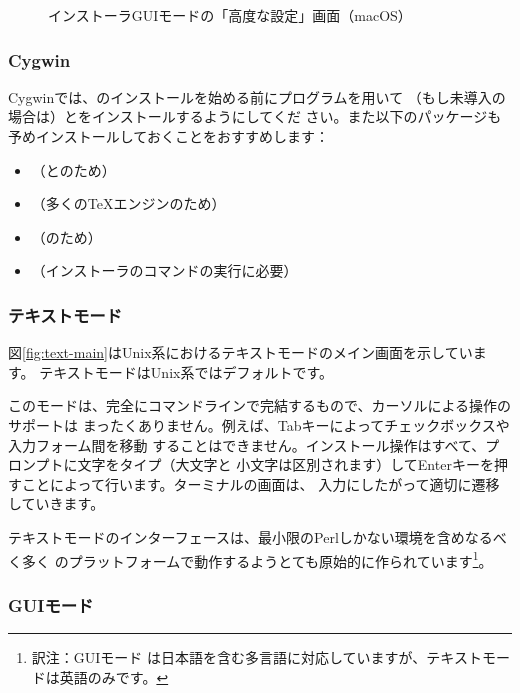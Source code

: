 \documentclass[uplatex,dvipdfmx,12pt]{jsarticle}
\begin{document}
\begin{figure}[tb]
\caption{\TL インストーラGUIモードの「高度な設定」画面（macOS）}
\label{fig:installer-advanced}
\end{figure}

\subsubsection{Cygwin}
\label{sec:cygwin}

Cygwinでは、\TL のインストールを始める前にプログラムを用いて
（もし未導入の場合は）とをインストールするようにしてくだ
さい。また以下のパッケージも予めインストールしておくことをおすすめします：
%
\begin{itemize}
\item {}（\XeTeX と\LuaTeX のため）
\item {}（多くの\TeX エンジンのため）
\item {}（のため）
\item {}（インストーラのコマンドの実行に必要）
\end{itemize}

\subsubsection{テキストモード}

図\ref{fig:text-main}はUnix系におけるテキストモードのメイン画面を示しています。
テキストモードはUnix系ではデフォルトです。

このモードは、完全にコマンドラインで完結するもので、カーソルによる操作のサポートは
まったくありません。例えば、Tabキーによってチェックボックスや入力フォーム間を移動
することはできません。インストール操作はすべて、プロンプトに文字をタイプ（大文字と
小文字は区別されます）してEnterキーを押すことによって行います。ターミナルの画面は、
入力にしたがって適切に遷移していきます。

テキストモードのインターフェースは、最小限のPerlしかない環境を含めなるべく多く
のプラットフォームで動作するようとても原始的に作られています\footnote{訳注：GUIモード
は日本語を含む多言語に対応していますが、テキストモードは英語のみです。}。

\subsubsection{GUIモード}
\label{sec:graphical-inst}
\end{document}
